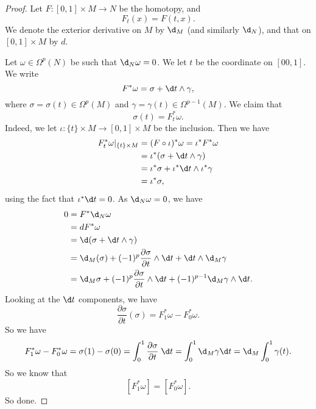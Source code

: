 \documentclass[a4paper]{article}
\begin{document}
\begin{proof}
  Let $F: [0, 1] \times M \to N$ be the homotopy, and
  \[
    F_t(x) = F(t, x).
  \]
  We denote the exterior derivative on $M$ by $\d_M$ (and similarly $\d_N$), and that on $[0, 1] \times M$ by $d$.

  Let $\omega \in \Omega^p(N)$ be such that $\d_N \omega = 0$. We let $t$ be the coordinate on $[00, 1]$. We write
  \[
    F^* \omega = \sigma + \d t \wedge \gamma,
  \]
  where $\sigma = \sigma(t) \in \Omega^p(M)$ and $\gamma = \gamma(t) \in \Omega^{p - 1}(M)$. We claim that
  \[
    \sigma(t) = F_t^* \omega.
  \]
  Indeed, we let $\iota: \{t\} \times M \to [0, 1] \times M$ be the inclusion. Then we have
  \begin{align*}
    F_t^* \omega |_{\{t\} \times M} &= (F \circ \iota)^* \omega = \iota^* F^* \omega \\
    &= \iota^* (\sigma + \d t \wedge \gamma)\\
    &= \iota^* \sigma + \iota^* \d t \wedge \iota^* \gamma\\
    &= \iota^* \sigma,
  \end{align*}
  using the fact that $\iota^* \d t = 0$. As $\d_N \omega = 0$, we have
  \begin{align*}
    0 &= F^* \d_N \omega \\
    &= d F^* \omega \\
    &= \d(\sigma + \d t \wedge \gamma)\\
    &= \d_M(\sigma) + (-1)^p\frac{\partial \sigma}{\partial t} \wedge \d t + \d t \wedge \d_M \gamma\\
    &= \d_M \sigma + (-1)^p \frac{\partial \sigma}{\partial t} \wedge \d t + (-1)^{p - 1} \d_M \gamma \wedge \d t.
  \end{align*}
  Looking at the $\d t$ components, we have
  \[
    \frac{\partial \sigma}{\partial t}(\sigma) = F_1^* \omega - F_0^* \omega.
  \]
  So we have
  \[
    F_1^* \omega - F_0^* \omega = \sigma(1) - \sigma(0) = \int_0^1 \frac{\partial \sigma}{\partial t} \;\d t = \int_0^1 \d_M \gamma \d t = \d_M \int_0^1 \gamma(t).
  \]
  So we know that
  \[
    [F_1^* \omega] = [F_0^* \omega].
  \]
  So done.
\end{proof}
\end{document}

